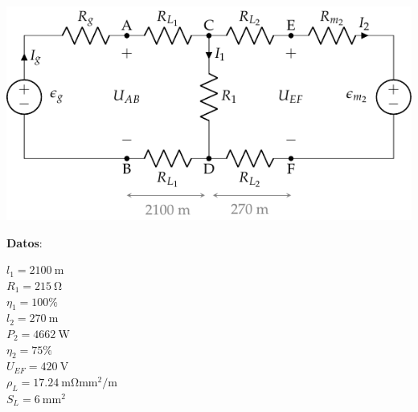 \documentclass[10pt]{article}
\begin{document}
\begin{minipage}{0.725\linewidth}
  \includegraphics[scale=1.18]{../figs/circuito_ejercicio2_BT1.pdf}
\end{minipage}
\begin{minipage}{0.275\linewidth}

  \vspace{-5mm}
  \textbf{Datos}:
  
  \vspace{2mm}

  $l_1 = \qty{2100}{\meter}$\\
  $R_1 = \qty{215}{\ohm}$\\
  $\eta_1 = 100\%$\\
  $l_2 = \qty{270}{\meter}$\\
  $P_2 = \qty{4662}{\watt}$\\
  $\eta_2 = 75\%$\\
  $U_{EF} = \qty{420}{\volt}$\\
  $\rho_L = \qty{17.24}{\milli\ohm\milli\meter\squared\per\meter}$\\
  $S_L = \qty{6}{\milli\meter\squared}$
\end{minipage}

\vspace{6mm}
\end{document}
